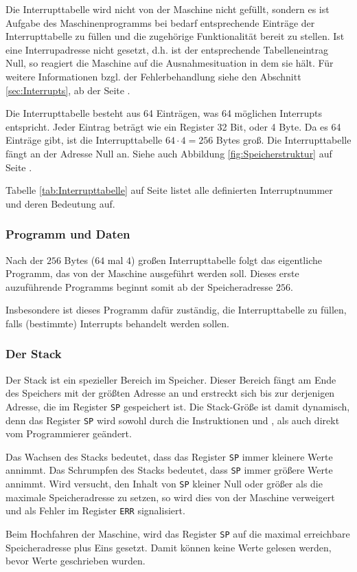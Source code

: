 Die Interrupttabelle wird nicht von der Maschine nicht gefüllt, sondern es ist
Aufgabe des Maschinenprogramms bei bedarf entsprechende Einträge der
Interrupttabelle zu füllen und die zugehörige Funktionalität bereit zu stellen.
Ist eine Interrupadresse nicht gesetzt, d.h. ist der entsprechende
Tabelleneintrag Null, so reagiert die Maschine auf die Ausnahmesituation
in dem sie hält. Für weitere Informationen bzgl. der Fehlerbehandlung siehe den
Abschnitt \ref{sec:Interrupts}, ab der Seite \pageref{sec:Interrupts}.

Die Interrupttabelle besteht aus 64 Einträgen, was 64 möglichen Interrupts
entspricht. Jeder Eintrag beträgt wie ein Register 32 Bit, oder 4 Byte. Da es
64 Einträge gibt, ist die Interrupttabelle $64 \cdot 4 = 256$ Bytes groß. Die
Interrupttabelle fängt an der Adresse Null an. Siehe auch Abbildung
\ref{fig:Speicherstruktur} auf Seite \pageref{fig:Speicherstruktur}.


Tabelle \ref{tab:Interrupttabelle} auf Seite
\pageref{tab:Interrupttabelle} listet alle definierten
Interruptnummer und deren Bedeutung auf.


\subsubsection{Programm und Daten}

Nach der $256$ Bytes ($64$ mal $4$) großen Interrupttabelle
folgt das eigentliche Programm, das von der Maschine ausgeführt werden soll.
Dieses erste auzuführende Programms beginnt somit ab der Speicheradresse $256$.

Insbesondere ist dieses Programm dafür zuständig, die Interrupttabelle zu
füllen, falls (bestimmte) Interrupts behandelt werden sollen.



\subsubsection{Der Stack}
\label{subsubsec:Stack}

Der Stack ist ein spezieller Bereich im Speicher. Dieser Bereich fängt am Ende
des Speichers mit der größten Adresse an und erstreckt sich bis zur derjenigen
Adresse, die im Register \texttt{SP} gespeichert ist. Die Stack-Größe ist damit
dynamisch, denn das Register \texttt{SP} wird sowohl durch die Instruktionen
 und , als auch direkt vom Programmierer geändert.

Das Wachsen des Stacks bedeutet, dass das Register
\texttt{SP} immer kleinere Werte annimmt. Das Schrumpfen
des Stacks bedeutet, dass \texttt{SP} immer größere Werte annimmt. Wird
versucht, den Inhalt von \texttt{SP} kleiner Null oder größer als die maximale
Speicheradresse zu setzen, so wird dies von der Maschine verweigert und als
Fehler im Register \texttt{ERR} signalisiert.

Beim Hochfahren der Maschine, wird das Register \texttt{SP} auf die
maximal erreichbare Speicheradresse plus Eins gesetzt. Damit können keine Werte
gelesen werden, bevor Werte geschrieben wurden.

